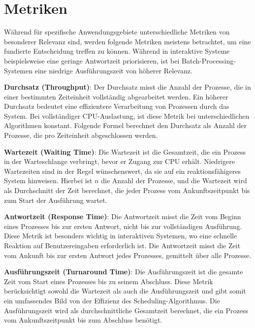 
\section{Metriken}
Während für spezifische Anwendungsgebiete unterschiedliche Metriken von besonderer Relevanz sind, werden folgende Metriken meistens betrachtet, um eine fundierte Entscheidung treffen zu können. Während in interaktive Systeme beispielsweise eine geringe Antwortzeit priorisieren, ist bei Batch-Processing-Systemen eine niedrige Ausführungszeit von höherer Relevanz.


\textbf{Durchsatz (Throughput)}: Der Durchsatz misst die Anzahl der Prozesse, die in einer bestimmten Zeiteinheit vollständig abgearbeitet werden. Ein höherer Durchsatz bedeutet eine effizientere Verarbeitung von Prozessen durch das System. Bei vollständiger \ac{CPU}-Auslastung, ist diese Metrik bei unterschiedlichen Algorithmen konstant. Folgende Formel berechnet den Durchsatz als Anzahl der Prozesse, die pro Zeiteinheit abgeschlossen werden.


\textbf{Wartezeit (Waiting Time)}: Die Wartezeit ist die Gesamtzeit, die ein Prozess in der Warteschlange verbringt, bevor er Zugang zur \ac{CPU} erhält. Niedrigere Wartezeiten sind in der Regel wünschenswert, da sie auf ein reaktionsfähigeres System hinweisen. Hierbei ist \( n \) die Anzahl der Prozesse, und die Wartezeit wird als Durchschnitt der Zeit berechnet, die jeder Prozess vom Ankunftszeitpunkt bis zum Start der Ausführung wartet.


\textbf{Antwortzeit (Response Time)}: Die Antwortzeit misst die Zeit vom Beginn eines Prozesses bis zur ersten Antwort, nicht bis zur vollständigen Ausführung. Diese Metrik ist besonders wichtig in interaktiven Systemen, wo eine schnelle Reaktion auf Benutzereingaben erforderlich ist. Die Antwortzeit misst die Zeit vom Ankunft bis zur ersten Antwort jedes Prozesses, gemittelt über alle Prozesse.


\textbf{Ausführungszeit (Turnaround Time)}: Die Ausführungszeit ist die gesamte Zeit vom Start eines Prozesses bis zu seinem Abschluss. Diese Metrik berücksichtigt sowohl die Wartezeit als auch die Ausführungszeit und gibt somit ein umfassendes Bild von der Effizienz des Scheduling-Algorithmus. Die Ausführungszeit wird als durchschnittliche Gesamtzeit berechnet, die ein Prozess vom Ankunftszeitpunkt bis zum Abschluss benötigt.


